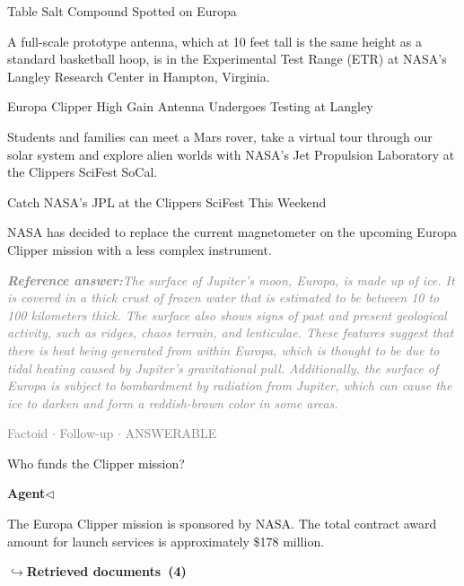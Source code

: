 \documentclass[a4paper,11pt]{article}
\begin{document}
\begin{docenv}
{Table Salt Compound Spotted on Europa

A full-scale prototype antenna, which at 10 feet tall is the same height as a standard basketball hoop, is in the Experimental Test Range (ETR) at NASA's Langley Research Center in Hampton, Virginia.

Europa Clipper High Gain Antenna Undergoes Testing at Langley

Students and families can meet a Mars rover, take a virtual tour through our solar system and explore alien worlds with NASA's Jet Propulsion Laboratory at the Clippers SciFest SoCal.

Catch NASA's JPL at the Clippers SciFest This Weekend

NASA has decided to replace the current magnetometer on the upcoming Europa Clipper mission with a less complex instrument.}
\end{docenv}
\begin{refanswerenv}
{\footnotesize\textit{\textcolor{gray}{\textbf{Reference answer:}\enspace The surface of Jupiter's moon, Europa, is made up of ice. It is covered in a thick crust of frozen water that is estimated to be between 10 to 100 kilometers thick. The surface also shows signs of past and present geological activity, such as ridges, chaos terrain, and lenticulae. These features suggest that there is heat being generated from within Europa, which is thought to be due to tidal heating caused by Jupiter's gravitational pull. Additionally, the surface of Europa is subject to bombardment by radiation from Jupiter, which can cause the ice to darken and form a reddish-brown color in some areas.}}}
\end{refanswerenv}
\vspace{0.5em}
\hfill{\tiny\textcolor{gray}{Factoid $\cdot$ Follow-up $\cdot$ ANSWERABLE}}
\begin{userbubble}
Who funds the Clipper mission?
\end{userbubble}
\noindent\hfill{\small\textcolor{agentcolor}{\textbf{Agent\enspace$\triangleleft$}}}
\begin{agentbubble}
The Europa Clipper mission is sponsored by NASA. The total contract award amount for launch services is approximately \$178 million.
\end{agentbubble}
\noindent\hfill{\footnotesize\textcolor{doccolor}{\textbf{$\hookrightarrow$\enspace Retrieved documents~(4)}}}
\end{document}
